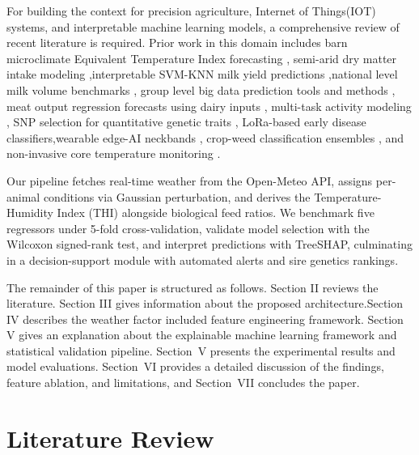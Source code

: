 \documentclass[conference]{IEEEtran}
\begin{document}
	For building the context for precision agriculture, Internet of Things(IOT) systems, and interpretable machine learning models, a comprehensive review of recent literature is required. Prior work in this domain includes barn microclimate Equivalent Temperature Index forecasting \cite{ref1}, semi-arid dry matter intake modeling \cite{ref2},interpretable SVM-KNN milk yield predictions \cite{ref3},national level milk volume benchmarks \cite{ref4}, group level big data prediction tools and methods \cite{ref5}, meat output regression forecasts using dairy inputs \cite{ref6}, multi-task activity modeling \cite{ref7}, SNP selection for quantitative genetic traits \cite{ref8}, LoRa-based early disease classifiers,wearable edge-AI neckbands \cite{ref9}, crop-weed classification ensembles \cite{ref11}, and non-invasive core temperature monitoring \cite{ref12}.
	
	\setlength{\parskip}{0pt}
	
	Our pipeline fetches real-time weather from the Open-Meteo API, assigns per-animal conditions via Gaussian perturbation, and derives the Temperature-Humidity Index (THI) alongside biological feed ratios. We benchmark five regressors under 5-fold cross-validation, validate model selection with the Wilcoxon signed-rank test, and interpret predictions with TreeSHAP, culminating in a decision-support module with automated alerts and sire genetics rankings.
	
	The remainder of this paper is structured as follows. Section II reviews the literature. Section III gives information about the proposed architecture.Section IV describes the weather factor included feature engineering framework. Section V gives an explanation about the explainable machine learning framework and statistical validation pipeline. Section~V presents the experimental results and model evaluations. Section~VI provides a detailed discussion of the findings, feature ablation, and limitations, and Section~VII concludes the paper.
	
	\section{Literature Review}
	
\end{document}
